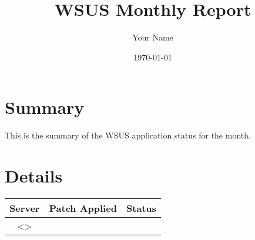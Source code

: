 \documentclass[a4paper]{article}
\title{WSUS Monthly Report}
\author{Your Name}
\date{\today}
\begin{document}
\maketitle

\section{Summary}
This is the summary of the WSUS application status for the month.

\section{Details}
\begin{longtable}{|c|c|c|}
\hline
\textbf{Server} & \textbf{Patch Applied} & \textbf{Status} \\
\hline
<>
\hline
\end{longtable}
\end{document}
